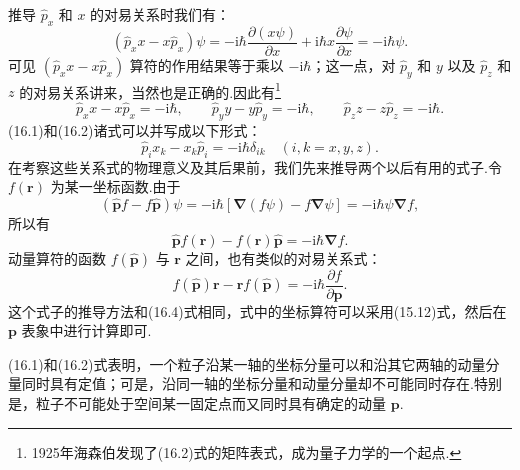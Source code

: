 推导 $\hat{p}_x$ 和 $x$ 的对易关系时我们有：
\begin{equation*}
  (\hat{p}_xx-x\hat{p}_x)\psi
  =-\mathrm{i}\hbar\frac{\partial(x\psi)}{\partial x}
  +\mathrm{i}\hbar x\frac{\partial\psi}{\partial x}
  =-\mathrm{i}\hbar\psi.
\end{equation*}
可见 $(\hat{p}_xx-x\hat{p}_x)$ 算符的作用结果等于乘以 $-\mathrm{i}\hbar$；这一点，对 $\hat{p}_y$ 和 $y$ 以及 $\hat{p}_z$ 和 $z$ 的对易关系讲来，当然也是正确的.因此有\footnote{1925年海森伯发现了(16.2)式的矩阵表式，成为量子力学的一个起点.}
\begin{equation}
  \hat{p}_xx-x\hat{p}_x=-\mathrm{i}\hbar,\qquad
  \hat{p}_yy-y\hat{p}_y=-\mathrm{i}\hbar,\qquad
  \hat{p}_zz-z\hat{p}_z=-\mathrm{i}\hbar.
\end{equation}
(16.1)和(16.2)诸式可以并写成以下形式：
\begin{equation}
  \hat{p}_ix_k-x_k\hat{p}_i=-\mathrm{i}\hbar\delta_{ik}
  \quad(i,k=x,y,z).
\end{equation}
在考察这些关系式的物理意义及其后果前，我们先来推导两个以后有用的式子.令 $f(\boldsymbol{r})$ 为某一坐标函数.由于
\begin{equation*}
  (\hat{\boldsymbol{p}}f-f\hat{\boldsymbol{p}})\psi
  =-\mathrm{i}\hbar[\boldsymbol{\nabla}(f\psi)-f\boldsymbol{\nabla}\psi]
  =-\mathrm{i}\hbar\psi\boldsymbol{\nabla}f,
\end{equation*}
所以有
\begin{equation}
  \hat{\boldsymbol{p}}f(\boldsymbol{r})-f(\boldsymbol{r})\hat{\boldsymbol{p}}
  =-\mathrm{i}\hbar\boldsymbol{\nabla}f.
\end{equation}
动量算符的函数 $f(\hat{\boldsymbol{p}})$ 与 $\boldsymbol{r}$ 之间，也有类似的对易关系式：
\begin{equation}
  f(\hat{\boldsymbol{p}})\boldsymbol{r}
  -\boldsymbol{r}f(\hat{\boldsymbol{p}})
  =-\mathrm{i}\hbar\frac{\partial f}{\partial\boldsymbol{p}}.
\end{equation}
这个式子的推导方法和(16.4)式相同，式中的坐标算符可以采用(15.12)式，然后在 $\boldsymbol{p}$ 表象中进行计算即可.

(16.1)和(16.2)式表明，一个粒子沿某一轴的坐标分量可以和沿其它两轴的动量分量同时具有定值；可是，沿同一轴的坐标分量和动量分量却不可能同时存在.特别是，粒子不可能处于空间某一固定点而又同时具有确定的动量 $\boldsymbol{p}$.

